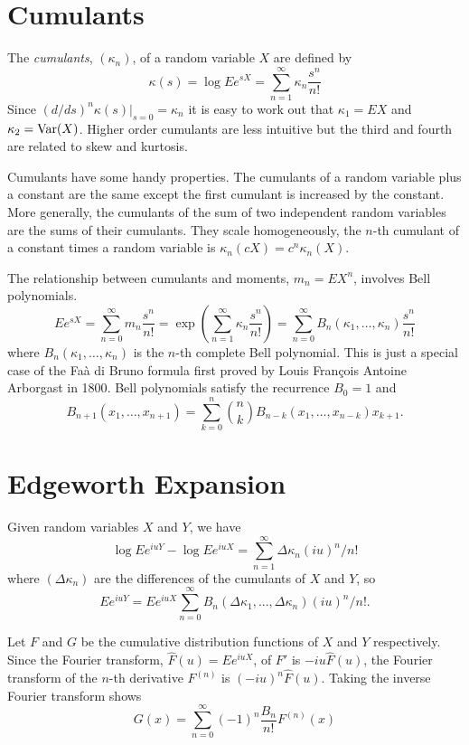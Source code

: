 \documentclass[11pt]{article}
\newcommand{\Var}{\mathop{\rm{Var}}}
\theoremstyle{definition}
\begin{document}
\section{Cumulants}

The {\em cumulants}, \((\kappa_n)\), of a random variable \(X\)
are defined by
\[
\kappa(s) = \log Ee^{sX} = \sum_{n=1}^\infty \kappa_n \frac{s^n}{n!}
\]
Since \((d/ds)^n\kappa(s)|_{s = 0} = \kappa_n\) it is easy to
work out that
\(\kappa_1 = EX\) and \(\kappa_2 = \Var(X)\). Higher order
cumulants are less intuitive but the third and fourth are
related to skew and kurtosis.

Cumulants have some handy properties. 
The cumulants of a random variable plus a constant are the 
same except the first cumulant is increased by the constant.
More generally, the cumulants of the sum of two independent 
random variables are the sums of their cumulants.
They scale homogeneously, the \(n\)-th cumulant of a constant
times a random variable is
\(\kappa_n(cX) = c^n\kappa_n(X)\).

The relationship between cumulants and moments, \(m_n = EX^n\),
involves Bell
polynomials\cite{Bel1934}.
\[
Ee^{sX} = \sum_{n=0}^\infty m_n \frac{s^n}{n!}
 = \exp(\sum_{n=1}^\infty \kappa_n \frac{s^n}{n!})
= \sum_{n=0}^\infty B_n(\kappa_1,\dots,\kappa_n) \frac{s^n}{n!}
\]
where \(B_n(\kappa_1,\dots,\kappa_n)\) is the \(n\)-th complete
Bell polynomial.
This is just a special case of the
Fa\`a di Bruno formula first proved by Louis Fran\c{c}ois Antoine
Arborgast in 1800\cite{Arb1800}.
Bell polynomials satisfy the recurrence \cite{Com1974} \(B_0 = 1\) and
\[
B_{n+1}(x_1,\dots,x_{n+1}) = \sum_{k=0}^n \binom{n}{k}
B_{n - k}(x_1,\dots, x_{n - k}) x_{k+1}.
\]

\section{Edgeworth Expansion}
Given random
variables \(X\) and \(Y\), we have
\[\log E e^{iuY} - \log E e^{iuX} = \sum_{n=1}^\infty \Delta\kappa_n (iu)^n/n!\]
where \((\Delta\kappa_n)\) are the differences of the cumulants 
of \(X\) and \(Y\), so
\[
Ee^{iuY} = Ee^{iuX}\sum_{n=0}^\infty B_n(\Delta\kappa_1,...,\Delta\kappa_n)(iu)^n/n!.
\]

Let \(F\) and \(G\) be the cumulative distribution functions of
\(X\) and \(Y\) respectively.
Since the Fourier transform, \(\hat{F}(u) = Ee^{iuX}\),
of \(F'\) is \(-iu \hat F(u)\),
the Fourier transform of the \(n\)-th derivative
\(F^{(n)}\) is \((-iu)^n\hat F(u)\).
Taking the inverse Fourier transform shows
\[
G(x) = \sum_{n=0}^\infty (-1)^n \frac{B_n}{n!} F^{(n)}(x)
\]
\end{document}
